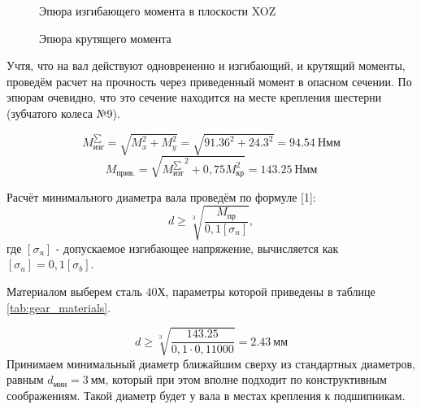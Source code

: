 \documentclass[14pt,a4paper,russian]{scrartcl}
\begin{document}
        \begin{figure}[h]
            \caption{Эпюра изгибающего момента в плоскости XOZ}
        \end{figure}
        \begin{figure}[h]
            \caption{Эпюра крутящего момента}
        \end{figure}

        Учтя, что на вал действуют одноврененно и изгибающий, и крутящий моменты,
        проведём расчет на прочность через приведенный момент в опасном сечении.
        По эпюрам очевидно, что это сечение находится на месте крепления шестерни
        (зубчатого колеса №9).

        \[ M^{\sum}_\text{изг} = \sqrt{M_x^2 + M_y^2} = \sqrt{91.36^2 + 24.3^2} = 94.54\ \text{Нмм}\]
        \[ M_\text{прив.} = \sqrt{{M^{\sum}_\text{изг}}^2 + 0,75M_\text{кр}^2} = 143.25\ \text{Нмм}\]

        Расчёт минимального диаметра вала проведём по формуле [1]:
        \[ d\geq \sqrt[3]{\frac{M_\text{пр}}{0,1[\sigma_u]}}, \]
        где \( [\sigma_u] \) - допускаемое изгибающее напряжение, вычисляется как
         \( [\sigma_u] = 0,1[\sigma_b] \).\par
        Материалом выберем сталь 40Х, параметры которой приведены в таблице \ref{tab:gear_materials}.\par

        \[ d\geq \sqrt[3]{\frac{143.25}{0,1\cdot 0,1 1000}} = 2.43\ \text{мм} \]
        Принимаем минимальный диаметр ближайшим сверху из стандартных диаметров, равным
        \( d_{\text{мин}} = 3\ \text{мм} \), который при этом вполне подходит по конструктивным
        соображениям. Такой диаметр будет у вала в местах крепления к подшипникам.
\end{document}
